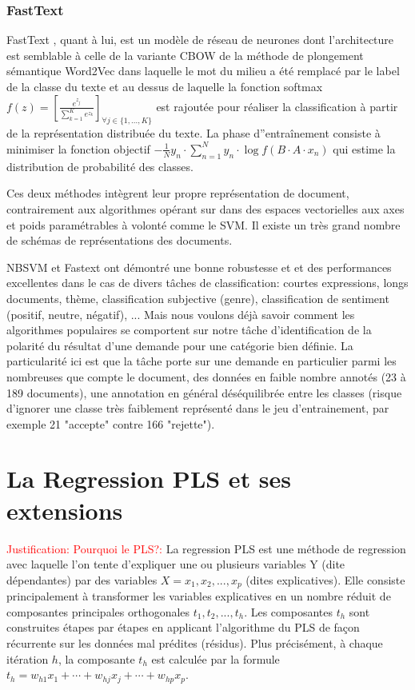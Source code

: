   
  \subsubsection{FastText}
  
 FastText \citep{grave2017fasttextcls}, quant à lui, est un modèle de réseau de neurones dont l'architecture est semblable à celle de la variante CBOW de la méthode de plongement sémantique Word2Vec dans laquelle le mot du milieu a été remplacé par le label de la classe du texte et au dessus de laquelle la fonction softmax $f(z) = \left[ \frac{e^{z_j}}{\sum\limits_{k=1}^K e^{z_k}} \right]_{\forall j \in \lbrace 1, ..., K \rbrace} $ est rajoutée pour réaliser la classification à partir de la représentation distribuée du texte. La phase d''entraînement consiste à minimiser la fonction objectif $-\frac{1}{N}y_n \cdot \sum\limits_{n=1}^N y_n \cdot \log{f(B\cdot A\cdot x_n)}$ qui estime la distribution de probabilité des classes.

Ces deux méthodes intègrent leur propre représentation de document, contrairement aux algorithmes opérant sur dans des espaces vectorielles aux axes et poids paramétrables à volonté comme le SVM. Il existe un très grand nombre de schémas de représentations des documents.

NBSVM et Fastext ont démontré une bonne robustesse et et des performances excellentes dans le cas de divers tâches de classification: courtes expressions, longs documents, thème, classification subjective (genre), classification de sentiment (positif, neutre, négatif), ... Mais nous voulons déjà savoir comment les algorithmes populaires se comportent sur notre tâche d'identification de la polarité du résultat d'une demande pour une catégorie bien définie. La particularité ici est que la tâche porte sur une demande en particulier parmi les nombreuses que compte le document, des données en faible nombre annotés (23 à 189 documents), une annotation en général déséquilibrée entre les classes (risque d'ignorer une classe très faiblement représenté dans le jeu d'entrainement, par exemple 21 "accepte" contre 166 "rejette").

\section{La Regression PLS et ses extensions}
\label{sec:sensresultat:pls}
\textcolor{red}{Justification: Pourquoi le PLS?:}
La regression PLS est une méthode de regression avec laquelle l'on tente d'expliquer une ou plusieurs variables Y (dite dépendantes) par des variables $X=x_1,x_2,...,x_p$ (dites explicatives). Elle consiste principalement à transformer les variables explicatives en un nombre réduit de composantes principales orthogonales $t_1, t_2, ..., t_h$. Les composantes $t_h$ sont construites étapes par étapes en applicant l'algorithme du PLS de façon récurrente sur les données mal prédites (résidus). Plus précisément, à chaque itération $h$, la composante $t_h$ est calculée par la formule $t_h = w_{h1} x_1 + \cdots + w_{hj} x_j + \cdots + w_{hp} x_p$. 

